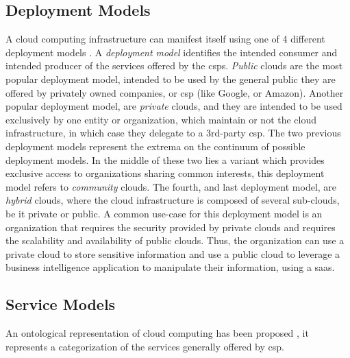\documentclass[12pt, titlepage]{uo_temp}
\begin{document}


     \subsection{Deployment Models}
     A cloud computing infrastructure can manifest itself using one of 4 different
     deployment models \cite{nist}. A \emph{deployment model} identifies the intended
     consumer and intended producer of the services offered by the
     \gls{csp}s. \emph{Public} clouds are the most popular deployment model, intended to
     be used by the general public they are offered by privately owned companies, or
     \gls{csp} (like Google, or Amazon). Another popular deployment model, are
     \emph{private} clouds, and they are intended to be used exclusively by one entity or
     organization, which maintain or not the cloud infrastructure, in which case they
     delegate to a 3rd-party \gls{csp}. The two previous deployment models represent the
     extrema on the continuum of possible deployment models. In the middle of these two
     lies a variant which provides exclusive access to organizations sharing common
     interests, this deployment model refers to \emph{community} clouds. The fourth, and
     last deployment model, are \emph{hybrid} clouds, where the cloud infrastructure is
     composed of several sub-clouds, be it private or public. A common use-case for this
     deployment model is an organization that requires the security provided by private
     clouds and requires the scalability and availability of public clouds. Thus, the
     organization can use a private cloud to store sensitive information and use a public
     cloud to leverage a business intelligence application to manipulate their
     information, using a \gls{saas}.

     \subsection{Service Models}
     An ontological representation of cloud computing has been proposed \cite{ontology},
     it represents a categorization of the services generally offered by \gls{csp}.
\end{document}
